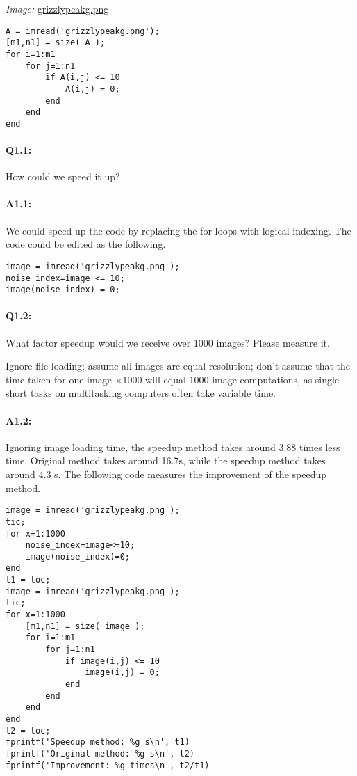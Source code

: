\documentclass[11pt]{article}
\begin{document}
\emph{Image:} \href{grizzlypeakg.png}{grizzlypeakg.png}

\begin{lstlisting}[style=Matlab-editor]
A = imread('grizzlypeakg.png');
[m1,n1] = size( A );
for i=1:m1
    for j=1:n1
        if A(i,j) <= 10
            A(i,j) = 0;
        end
    end
end
\end{lstlisting}

\paragraph{Q1.1:} How could we speed it up?

\paragraph{A1.1:} We could speed up the code by replacing the for loops with logical indexing. The code could be edited as the following.
\begin{lstlisting}[style=Matlab-editor]
image = imread('grizzlypeakg.png');
noise_index=image <= 10;
image(noise_index) = 0;
\end{lstlisting}


\pagebreak
\paragraph{Q1.2:} What factor speedup would we receive over 1000 images? Please measure it.

Ignore file loading; assume all images are equal resolution; don't assume that the time taken for one image $\times1000$ will equal $1000$ image computations, as single short tasks on multitasking computers often take variable time.

\paragraph{A1.2:} Ignoring image loading time, the speedup method takes around 3.88 times less time. Original method takes around 16.7s, while the speedup method takes around 4.3 s. The following code measures the improvement of the speedup method.
\begin{lstlisting}[style=Matlab-editor]
image = imread('grizzlypeakg.png');
tic;
for x=1:1000
    noise_index=image<=10;
    image(noise_index)=0;
end
t1 = toc;
image = imread('grizzlypeakg.png');
tic;
for x=1:1000
    [m1,n1] = size( image );
    for i=1:m1
        for j=1:n1
            if image(i,j) <= 10
                image(i,j) = 0;
            end
        end
    end
end
t2 = toc;
fprintf('Speedup method: %g s\n', t1)
fprintf('Original method: %g s\n', t2)
fprintf('Improvement: %g times\n', t2/t1)
\end{lstlisting}
\end{document}
